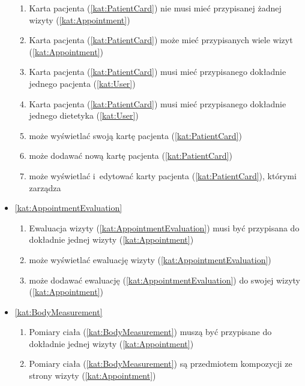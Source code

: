 \begin{itemize}[label={\textbf{Reguły dla}}, wide, labelwidth=!, labelindent=0pt]
\begin{enumerate}[label={\textbf{REG/4/\protect\twodigits{\arabic{enumi}}}}, wide, labelwidth=!, align=left, leftmargin=3cm, resume]
        \item Karta pacjenta (\ref{kat:PatientCard}) nie musi mieć przypisanej żadnej wizyty (\ref{kat:Appointment})
        \item Karta pacjenta (\ref{kat:PatientCard}) może mieć przypisanych wiele wizyt (\ref{kat:Appointment})
        \item Karta pacjenta (\ref{kat:PatientCard}) musi mieć przypisanego dokładnie jednego pacjenta (\ref{kat:User})
        \item Karta pacjenta (\ref{kat:PatientCard}) musi mieć przypisanego dokładnie jednego dietetyka (\ref{kat:User})
        \item {} może wyświetlać swoją kartę pacjenta (\ref{kat:PatientCard})
        \item {} może dodawać nową kartę pacjenta (\ref{kat:PatientCard})
        \item {} może wyświetlać i~edytować karty pacjenta (\ref{kat:PatientCard}), którymi zarządza
    \end{enumerate}
    \item\ref{kat:AppointmentEvaluation}\mynobreakpar
    \begin{enumerate}[label={\textbf{REG/4/\protect\twodigits{\arabic{enumi}}}}, wide, labelwidth=!, align=left, leftmargin=3cm, resume]
        \item Ewaluacja wizyty (\ref{kat:AppointmentEvaluation}) musi być przypisana do dokładnie jednej wizyty (\ref{kat:Appointment})
        \item {} może wyświetlać ewaluację wizyty (\ref{kat:AppointmentEvaluation})
        \item {} może dodawać ewaluację (\ref{kat:AppointmentEvaluation}) do swojej wizyty (\ref{kat:Appointment})
    \end{enumerate}
    \item\ref{kat:BodyMeasurement}\mynobreakpar
    \begin{enumerate}[label={\textbf{REG/4/\protect\twodigits{\arabic{enumi}}}}, wide, labelwidth=!, align=left, leftmargin=3cm, resume]
        \item Pomiary ciała (\ref{kat:BodyMeasurement}) muszą być przypisane do dokładnie jednej wizyty (\ref{kat:Appointment})
        \item Pomiary ciała (\ref{kat:BodyMeasurement}) są przedmiotem kompozycji ze strony wizyty (\ref{kat:Appointment})

\end{enumerate}
\end{itemize}
